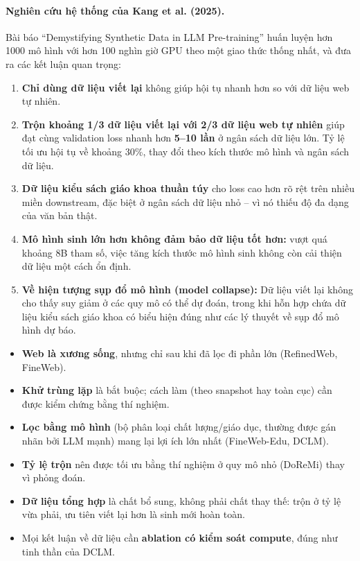 \paragraph{Nghiên cứu hệ thống của Kang et al. (2025).} Bài báo “Demystifying Synthetic Data in LLM Pre-training” \cite{kang2025synthetic} huấn luyện hơn 1000 mô hình với hơn 100 nghìn giờ GPU theo một giao thức thống nhất, và đưa ra các kết luận quan trọng:
\begin{enumerate}
	\item \textbf{Chỉ dùng dữ liệu viết lại} không giúp hội tụ nhanh hơn so với dữ liệu web tự nhiên.
	\item \textbf{Trộn khoảng 1/3 dữ liệu viết lại với 2/3 dữ liệu web tự nhiên} giúp đạt cùng validation loss nhanh hơn \textbf{5--10 lần} ở ngân sách dữ liệu lớn. Tỷ lệ tối ưu hội tụ về khoảng 30\%, thay đổi theo kích thước mô hình và ngân sách dữ liệu.
	\item \textbf{Dữ liệu kiểu sách giáo khoa thuần túy} cho loss cao hơn rõ rệt trên nhiều miền downstream, đặc biệt ở ngân sách dữ liệu nhỏ -- vì nó thiếu độ đa dạng của văn bản thật.
	\item \textbf{Mô hình sinh lớn hơn không đảm bảo dữ liệu tốt hơn:} vượt quá khoảng 8B tham số, việc tăng kích thước mô hình sinh không còn cải thiện dữ liệu một cách ổn định.
	\item \textbf{Về hiện tượng sụp đổ mô hình (model collapse):} Dữ liệu viết lại không cho thấy suy giảm ở các quy mô có thể dự đoán, trong khi hỗn hợp chứa dữ liệu kiểu sách giáo khoa có biểu hiện đúng như các lý thuyết về sụp đổ mô hình dự báo.
\end{enumerate}

\begin{tcolorbox}[title={Tổng kết: Những nguyên tắc về dữ liệu tiền huấn luyện năm 2026}, colback=green!5!white, colframe=green!60!black, fonttitle=\bfseries]
\begin{itemize}
	\item \textbf{Web là xương sống}, nhưng chỉ sau khi đã lọc đi phần lớn (RefinedWeb, FineWeb).
	\item \textbf{Khử trùng lặp} là bắt buộc; cách làm (theo snapshot hay toàn cục) cần được kiểm chứng bằng thí nghiệm.
	\item \textbf{Lọc bằng mô hình} (bộ phân loại chất lượng/giáo dục, thường được gán nhãn bởi LLM mạnh) mang lại lợi ích lớn nhất (FineWeb-Edu, DCLM).
	\item \textbf{Tỷ lệ trộn} nên được tối ưu bằng thí nghiệm ở quy mô nhỏ (DoReMi) thay vì phỏng đoán.
	\item \textbf{Dữ liệu tổng hợp} là chất bổ sung, không phải chất thay thế: trộn ở tỷ lệ vừa phải, ưu tiên viết lại hơn là sinh mới hoàn toàn.
	\item Mọi kết luận về dữ liệu cần \textbf{ablation có kiểm soát compute}, đúng như tinh thần của DCLM.
\end{itemize}
\end{tcolorbox}
